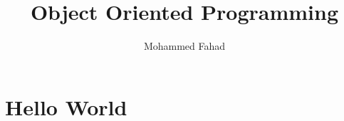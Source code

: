 \documentclass{article}
\title{Object Oriented Programming}
\author{Mohammed Fahad}
\begin{document}
\maketitle

\section{Hello World}
\end{document}
